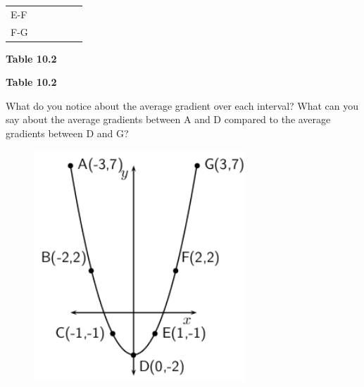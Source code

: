 \begin{table}[H]
\begin{center}
\begin{xtabular}[t]{|l|l|l|l|l|l|}
        E-F &
         &
         &
         &
         &
     \tabularnewline{}
        F-G &
         &
         &
         &
         &
     \tabularnewline{}
    \end{xtabular}
      \end{center}
    \begin{center}{\small\bfseries Table 10.2}\end{center}
    \begin{caption}{\small\bfseries Table 10.2}\end{caption}
\end{table}
    \par
      \label{m39223*id190636}
What do you notice about the average gradient over each interval? What can you
say about the average gradients between A and D compared to the average
gradients between D and G?\par 
      \label{m39223*id190641}
    \setcounter{subfigure}{0}
	\begin{figure}[H] %
    \begin{center}
    \label{m39223*id190642!!!underscore!!!media}\label{m39223*id190642!!!underscore!!!printimage}\includegraphics[width=300px]{col11306.imgs/m39223_MG10C12_002.png} %
      \vspace{2pt}
    \vspace{.1in}
    \end{center}
 \end{figure}       
